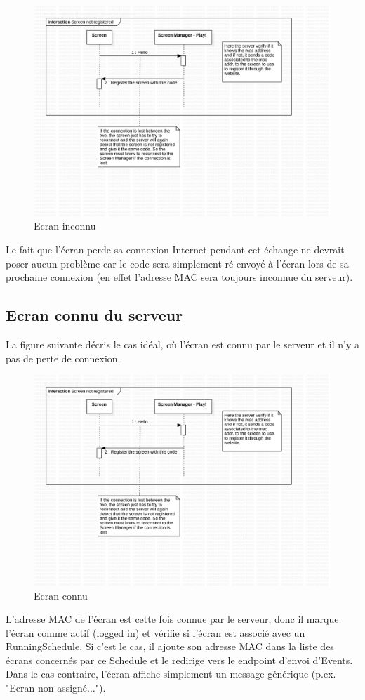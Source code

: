 \documentclass[french]{article}
\begin{document}
		\begin{figure}[hbt!]
			\centering
			\includegraphics[page={1}, scale=0.5]{protocol_v2}
			\caption{Ecran inconnu}
		\end{figure}
	
	Le fait que l'écran perde sa connexion Internet pendant cet échange ne devrait poser aucun problème car le code sera simplement ré-envoyé à l'écran lors de sa prochaine connexion (en effet l'adresse MAC sera toujours inconnue du serveur). \newpage
	
\subsection{Ecran connu du serveur}
	La figure suivante décris le cas idéal, où l'écran est connu par le serveur et il n'y a pas de perte de connexion.
	\begin{figure}[h!]
		\centering
		\includegraphics[page={3}, scale=0.5]{protocol_v2}
		\caption{Ecran connu}
	\end{figure}			
	L'adresse MAC de l'écran est cette fois connue par le serveur, donc il marque l'écran comme actif (logged in) et vérifie si l'écran est associé avec un RunningSchedule. Si c'est le cas, il ajoute son adresse MAC dans la liste des écrans concernés par ce Schedule et le redirige vers le endpoint d'envoi d'Events. Dans le cas contraire, l'écran affiche simplement un message générique (p.ex. "Ecran non-assigné..."). \newpage
	
\end{document}
